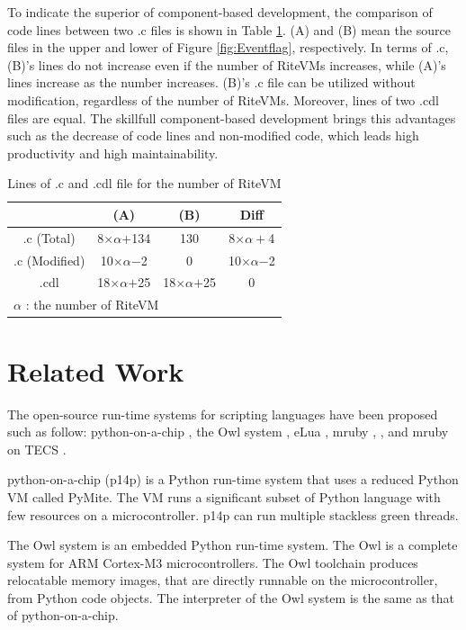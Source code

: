 \documentclass[a4j,12pt,oneside,openany,english]{jsbook}
\begin{document}
To indicate the superior of component-based development, the comparison of code lines between two .c files is shown in Table \ref{tab:codesize}.
(A) and (B) mean the source files in the upper and lower of Figure \ref{fig:Eventflag}, respectively. 
In terms of .c, (B)'s lines do not increase even if the number of RiteVMs increases, while (A)'s lines increase as the number increases.
(B)'s .c file can be utilized without modification, regardless of the number of RiteVMs.
Moreover, lines of two .cdl files are equal.
The skillfull component-based development brings this advantages such as the decrease of code lines and non-modified code, which leads high productivity and high maintainability.

\begin{table}[t]
    \centering
    \caption{Lines of .c and .cdl file for the number of RiteVM}
    \begin{tabular}{c||cc|c}
                & (A)       & (B)     & Diff  \\ \hline
        .c (Total)      & 8$\times$$\alpha$$+$134  & 130     & 8$\times$$\alpha+$4\\
        .c (Modified)   & 10$\times\alpha$$-$2 & 0   &  10$\times\alpha$$-$2 \\
        .cdl    & 18$\times$$\alpha$$+$25   & 18$\times$$\alpha$$+$25 & 0     \\
        \multicolumn{3}{l}{{\small $\alpha$} : {\scriptsize the number of RiteVM}}
    \end{tabular}
    \label{tab:codesize}
\end{table}

\chapter{Related Work}
\label{sec:Related work}
The open-source run-time systems for scripting languages have been proposed such as follow:
python-on-a-chip \cite{url:python-on-a-chip}, the Owl system \cite{par:owl}, eLua \cite{url:eLua}, mruby \cite{par:mruby}, \cite{url:mruby}, and mruby on TECS \cite{par:mrubyonTECS}.

python-on-a-chip (p14p) is a Python run-time system that uses a reduced Python VM called PyMite.
The VM runs a significant subset of Python language with few resources on a microcontroller.
p14p can run multiple stackless green threads.

The Owl system is an embedded Python run-time system.
The Owl is a complete system for ARM Cortex-M3 microcontrollers.
The Owl toolchain produces relocatable memory images, that are directly runnable on the microcontroller, from Python code objects.
The interpreter of the Owl system is the same as that of python-on-a-chip.
\end{document}
